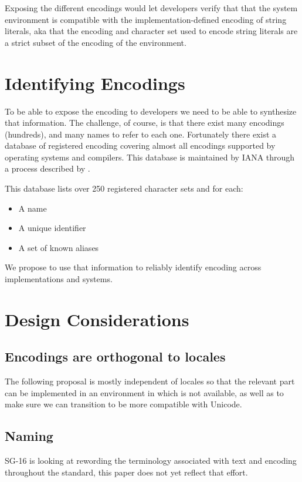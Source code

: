 \documentclass{wg21}
\begin{document}
Exposing the different encodings would let developers verify that that the system environment is compatible with the implementation-defined encoding of string literals, aka that the encoding and character set used to encode string literals are a strict subset of the encoding of the environment.

\section{Identifying Encodings}

To be able to expose the encoding to developers we need to be able to synthesize that information.
The challenge, of course, is that there exist many encodings (hundreds), and many names to refer to each one.
Fortunately there exist a database of registered encoding covering almost all encodings supported by operating systems and compilers.
This database is maintained by IANA through a process described by \cite{rfc2978}.

This database lists over 250 registered character sets and for each:
\begin{itemize}
    \item A name
    \item A unique identifier
    \item A set of known aliases
\end{itemize}

We propose to use that information to reliably identify encoding across implementations and systems.


\section{Design Considerations}

\subsection{Encodings are orthogonal to locales}

The following proposal is mostly independent of locales so that the relevant part can be implemented in an environment in which 
is not available, as well as to make sure we can transition  to be more compatible with Unicode.

\subsection{Naming}
SG-16 is looking at rewording the terminology associated with text and encoding throughout the standard, this paper does not yet reflect that effort.
\end{document}
